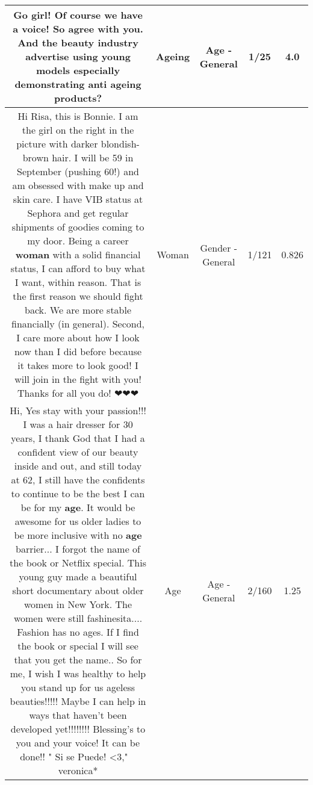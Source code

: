 \documentclass[11pt]{article}
\newlength\mylength
\begin{document}
\begin{center}
\begin{longtable}{|C{.65\mylength}|C{.30\mylength}|C{.12\mylength}|C{.12\mylength}|C{.12\mylength}|}
  \small Go girl! Of course we have a voice! So agree with you. And the beauty industry advertise using young models especially demonstrating anti \textbf{ageing} products?\normalsize   & Ageing & Age - General & 1/25 & 4.0 \\  \hline
  \small Hi Risa, this is Bonnie.  I am the girl on the right in the picture with darker blondish-brown hair.  I will be 59 in September (pushing 60!) and am obsessed with make up and skin care.  I have VIB status at Sephora and get regular shipments of goodies coming to my door.  Being a career \textbf{woman} with a solid financial status, I can afford to buy what I want, within reason.  That is the first reason we should fight back.  We are more stable financially (in general).  Second, I care more about how I look now than I did before because it takes more to look good!   I will join in the fight with you!  Thanks for all you do!  ❤❤❤\normalsize   & Woman & Gender - General & 1/121 & 0.826 \\  \hline
  \small Hi, Yes stay with your passion!!! I was a hair dresser for 30 years, I thank God that I had a confident view of our beauty inside and out, and still today at 62, I still have the confidents to continue to be the best I can be for my \textbf{age}. It would be awesome for us older ladies  to be more inclusive with no \textbf{age} barrier... I forgot the name of the book or Netflix special. This young guy made a  beautiful short documentary about older women in New York. The women were still fashinesita.... Fashion has no ages. If I find the book or special I will see that you get the name..   So for me, I wish I was healthy to help you stand up for us ageless beauties!!!!! Maybe I can help in ways that haven't been developed yet!!!!!!!! Blessing's to you and your voice! It can be done!!  " Si se Puede! <3,"   ~ veronica*\normalsize   & Age & Age - General & 2/160 & 1.25 \\  \hline

\end{longtable}
\end{center}
\end{document}
